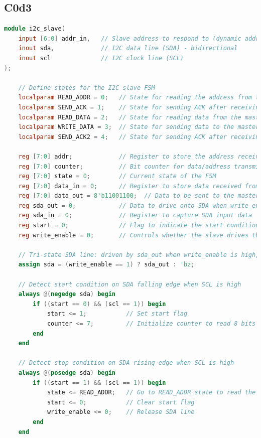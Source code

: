 \documentclass[a4paper,12pt]{report}
\begin{document}
\subsection{C0d3}
\begin{lstlisting}[language=Verilog, caption={I2C Slave Module in Verilog}, label=lst:i2c_slave]
module i2c_slave(
    input [6:0] addr_in,   // Slave address to respond to (dynamic address input)
    inout sda,             // I2C data line (SDA) - bidirectional
    inout scl              // I2C clock line (SCL)
);

    // Define states for the I2C slave FSM
    localparam READ_ADDR = 0;   // State for reading the address from the master
    localparam SEND_ACK = 1;    // State for sending ACK after receiving a matching address
    localparam READ_DATA = 2;   // State for reading data from the master
    localparam WRITE_DATA = 3;  // State for sending data to the master
    localparam SEND_ACK2 = 4;   // State for sending ACK after receiving data from the master

    reg [7:0] addr;             // Register to store the address received from the master
    reg [7:0] counter;          // Bit counter for data/address transmission
    reg [7:0] state = 0;        // Current state of the FSM
    reg [7:0] data_in = 0;      // Register to store data received from the master
    reg [7:0] data_out = 8'b11001100;  // Data to be sent to the master in read mode
    reg sda_out = 0;            // Data to drive onto SDA when write_enable is high
    reg sda_in = 0;             // Register to capture SDA input data
    reg start = 0;              // Flag to indicate the start condition (SDA goes low while SCL is high)
    reg write_enable = 0;       // Controls whether the slave drives the SDA line

    // Tri-state SDA line: driven by sda_out when write_enable is high, otherwise high-impedance
    assign sda = (write_enable == 1) ? sda_out : 'bz;

    // Detect start condition on SDA falling edge when SCL is high
    always @(negedge sda) begin
        if ((start == 0) && (scl == 1)) begin
            start <= 1;           // Set start flag
            counter <= 7;         // Initialize counter to read 8 bits (address or data)
        end
    end

    // Detect stop condition on SDA rising edge when SCL is high
    always @(posedge sda) begin
        if ((start == 1) && (scl == 1)) begin
            state <= READ_ADDR;   // Go to READ_ADDR state to read the address from master
            start <= 0;           // Clear start flag
            write_enable <= 0;    // Release SDA line
        end
    end


\end{lstlisting}
\end{document}
